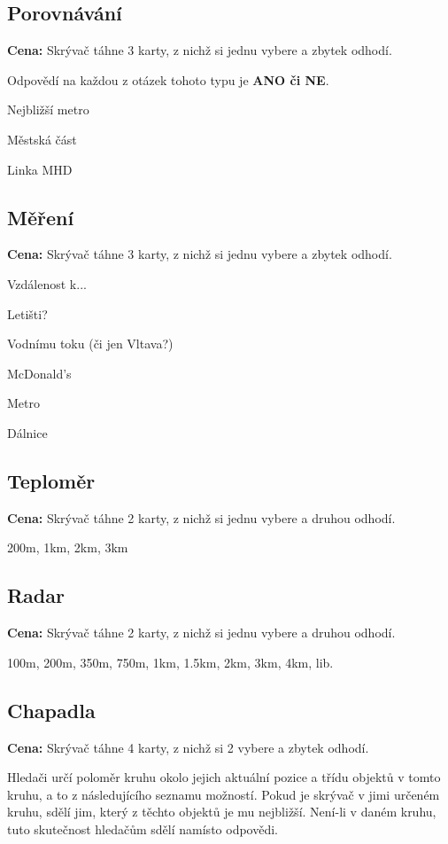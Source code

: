 \documentclass{book}
\begin{document}
\subsection{Porovnávání}

\textbf{Cena:} Skrývač táhne 3 karty, z nichž si jednu vybere a zbytek odhodí.

Odpovědí na každou z otázek tohoto typu je \textbf{ANO či NE}.

Nejbližší metro

Městská část

Linka MHD

\subsection{Měření}

\textbf{Cena:} Skrývač táhne 3 karty, z nichž si jednu vybere a zbytek odhodí.

Vzdálenost k...

Letišti?

Vodnímu toku (či jen Vltava?)

McDonald's

Metro

Dálnice

\subsection{Teploměr}

\textbf{Cena:} Skrývač táhne 2 karty, z nichž si jednu vybere a druhou odhodí.

200m, 1km, 2km, 3km

\subsection{Radar}

\textbf{Cena:} Skrývač táhne 2 karty, z nichž si jednu vybere a druhou odhodí.

100m, 200m, 350m, 750m, 1km, 1.5km, 2km, 3km, 4km, lib.

\subsection{Chapadla}

\textbf{Cena:} Skrývač táhne 4 karty, z nichž si 2 vybere a zbytek odhodí.

Hledači určí poloměr kruhu okolo jejich aktuální pozice a třídu objektů v tomto kruhu, a to z následujícího seznamu možností. Pokud je skrývač v jimi určeném kruhu, sdělí jim, který z těchto objektů je mu nejbližší. Není-li v daném kruhu, tuto skutečnost hledačům sdělí namísto odpovědi.
\end{document}
